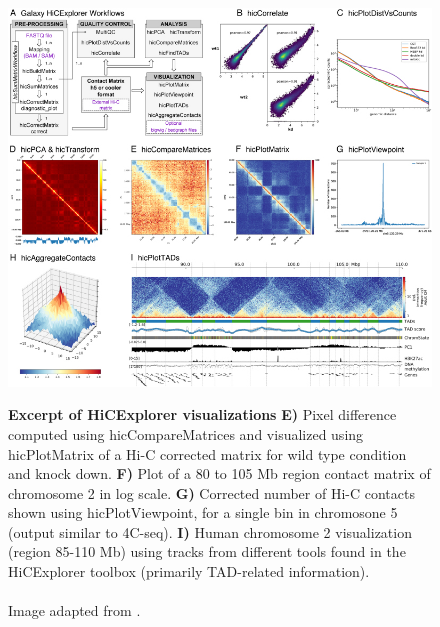 
\begin{figure}[t]
\begin{centering}
    {\includegraphics[scale=3.8,trim=37 0 0 45,clip]{figures/background/HiCExplorer.jpg}}
    \caption[Excerpt of HiCExplorer visualizations]
    {
        \textbf{Excerpt of HiCExplorer visualizations}
        \textbf{E)} Pixel difference computed using hicCompareMatrices and
        visualized using hicPlotMatrix of a Hi-C corrected matrix for wild type
        condition and knock down.
        \textbf{F)} Plot of a 80 to 105 Mb region contact matrix of chromosome 2 in log scale.
        \textbf{G)} Corrected number of Hi-C contacts shown using
        hicPlotViewpoint, for a single bin in chromosone 5 (output similar to
        4C-seq).
        \textbf{I)} Human chromosome 2 visualization (region 85-110 Mb) using
        tracks from different tools found in the HiCExplorer toolbox (primarily
        TAD-related information). \\
        \\Image adapted from \cite{wolff2018galaxy}.}
    \label{fig:comparison3C}\label{fig:HiCExplorer}
\end{centering}
\end{figure}



